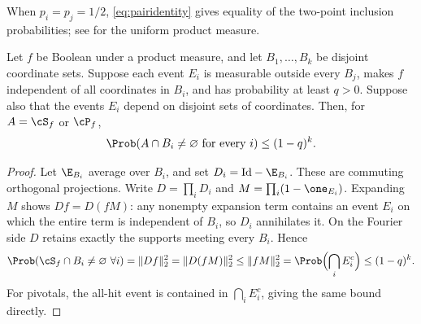 When $p_i=p_j=1/2$, \eqref{eq:pairidentity} gives equality of the two-point inclusion probabilities; see \cite[equation~(2.13)]{GPS} for the uniform product measure.

\begin{lemma}\label{lem:blockguards}
Let $f$ be Boolean under a product measure, and let $B_1,\ldots,B_k$ be disjoint coordinate sets. Suppose each event $E_i$ is measurable outside every $B_j$, makes $f$ independent of all coordinates in $B_i$, and has probability at least $q>0$. Suppose also that the events $E_i$ depend on disjoint sets of coordinates. Then, for $A=\cS_f$ or $\cP_f$,
\begin{equation}\label{eq:allhit}
 \Prob(A\cap B_i\ne\varnothing\text{ for every }i)\le(1-q)^k.
\end{equation}
\end{lemma}
\begin{proof}
Let $\E_{B_i}$ average over $B_i$, and set $D_i=\mathrm{Id}-\E_{B_i}$. These are commuting orthogonal projections. Write $D=\prod_iD_i$ and $M=\prod_i(1-\one_{E_i})$. Expanding $M$ shows $Df=D(fM)$: any nonempty expansion term contains an event $E_i$ on which the entire term is independent of $B_i$, so $D_i$ annihilates it. On the Fourier side $D$ retains exactly the supports meeting every $B_i$. Hence
\[
 \Prob(\cS_f\cap B_i\ne\varnothing\ \forall i)
 =\|Df\|_2^2=\|D(fM)\|_2^2
 \le\|fM\|_2^2
 =\Prob\Bigl(\bigcap_iE_i^c\Bigr)\le(1-q)^k.
\]
For pivotals, the all-hit event is contained in $\bigcap_iE_i^c$, giving the same bound directly.
\end{proof}

